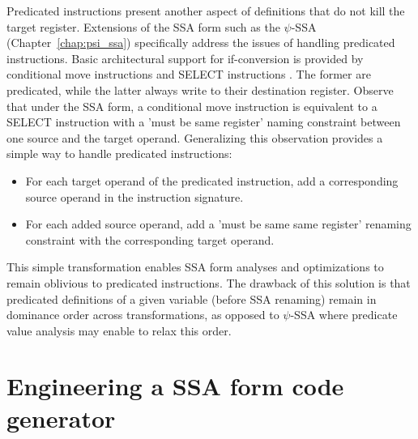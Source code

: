 Predicated instructions present another aspect of definitions that do not kill
the target register. Extensions of the SSA form such as the $\psi$-SSA
(Chapter~\ref{chap:psi_ssa}) specifically address the issues of handling
predicated instructions. Basic architectural support for if-conversion is
provided by conditional move instructions and SELECT instructions
\cite{Mahlke:1995:ISCA}.  The former are predicated, while the latter always
write to their destination register. Observe that under the SSA form, a
conditional move instruction is equivalent to a SELECT instruction with a 'must
be same register' naming constraint between one source and the target operand.
Generalizing this observation provides a simple way to handle predicated
instructions: \begin{itemize}
\item For each target operand of the predicated instruction, add a corresponding
source operand in the instruction signature.
\item For each added source operand, add a 'must be same same register' renaming
constraint with the corresponding target operand.
\end{itemize}
This simple transformation enables SSA form analyses and optimizations to remain
oblivious to predicated instructions. The drawback of this solution is that
predicated definitions of a given variable (before SSA renaming) remain in
dominance order across transformations, as opposed to $\psi$-SSA where predicate
value analysis may enable to relax this order.

%


\section{Engineering a SSA form code generator}
\label{sec:ssa-codegen-engineering}

%
%
%
%
%
%

